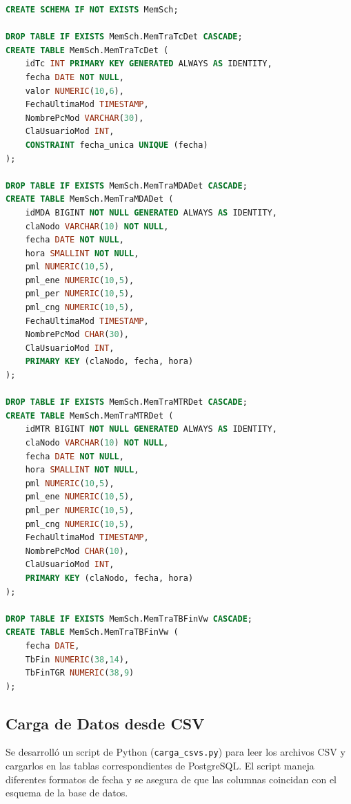 \documentclass[11pt, a4paper]{article}
\begin{document}
\begin{lstlisting}[language=SQL]
CREATE SCHEMA IF NOT EXISTS MemSch;

DROP TABLE IF EXISTS MemSch.MemTraTcDet CASCADE;
CREATE TABLE MemSch.MemTraTcDet (
    idTc INT PRIMARY KEY GENERATED ALWAYS AS IDENTITY,
    fecha DATE NOT NULL,
    valor NUMERIC(10,6),
    FechaUltimaMod TIMESTAMP,
    NombrePcMod VARCHAR(30),
    ClaUsuarioMod INT,
    CONSTRAINT fecha_unica UNIQUE (fecha)
);

DROP TABLE IF EXISTS MemSch.MemTraMDADet CASCADE;
CREATE TABLE MemSch.MemTraMDADet (
    idMDA BIGINT NOT NULL GENERATED ALWAYS AS IDENTITY,
    claNodo VARCHAR(10) NOT NULL,
    fecha DATE NOT NULL,
    hora SMALLINT NOT NULL,
    pml NUMERIC(10,5),
    pml_ene NUMERIC(10,5),
    pml_per NUMERIC(10,5),
    pml_cng NUMERIC(10,5),
    FechaUltimaMod TIMESTAMP,
    NombrePcMod CHAR(30),
    ClaUsuarioMod INT,
    PRIMARY KEY (claNodo, fecha, hora)
);

DROP TABLE IF EXISTS MemSch.MemTraMTRDet CASCADE;
CREATE TABLE MemSch.MemTraMTRDet (
    idMTR BIGINT NOT NULL GENERATED ALWAYS AS IDENTITY,
    claNodo VARCHAR(10) NOT NULL,
    fecha DATE NOT NULL,
    hora SMALLINT NOT NULL,
    pml NUMERIC(10,5),
    pml_ene NUMERIC(10,5),
    pml_per NUMERIC(10,5),
    pml_cng NUMERIC(10,5),
    FechaUltimaMod TIMESTAMP,
    NombrePcMod CHAR(10),
    ClaUsuarioMod INT,
    PRIMARY KEY (claNodo, fecha, hora)
);

DROP TABLE IF EXISTS MemSch.MemTraTBFinVw CASCADE;
CREATE TABLE MemSch.MemTraTBFinVw (
    fecha DATE,
    TbFin NUMERIC(38,14),
    TbFinTGR NUMERIC(38,9)
);
\end{lstlisting}

\newpage
\subsection{Carga de Datos desde CSV}
Se desarrolló un script de Python (\texttt{carga\_csvs.py}) para leer los archivos CSV y cargarlos en las tablas correspondientes de PostgreSQL. El script maneja diferentes formatos de fecha y se asegura de que las columnas coincidan con el esquema de la base de datos.
\end{document}
